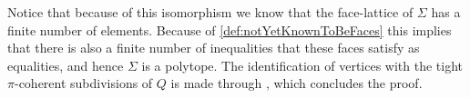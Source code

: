 \documentclass[10pt,a4paper]{article}
\theoremstyle{plain}
\theoremstyle{remark}
\theoremstyle{definition}
\begin{document}
    
    Notice that because of this isomorphism we know that the face-lattice of $\Sigma$ has a finite number of elements. 
    Because of \cref{def:notYetKnownToBeFaces} this implies that there is also a finite number of inequalities that these faces satisfy as equalities, 
    and hence $\Sigma$ is a polytope.
    The identification of vertices with the tight $\pi$-coherent subdivisions of $Q$ 
    is made through \cite[Lemma 9.5]{ziegler2012lectures}, which concludes the proof.
    
    
    
    
    
\end{document}
